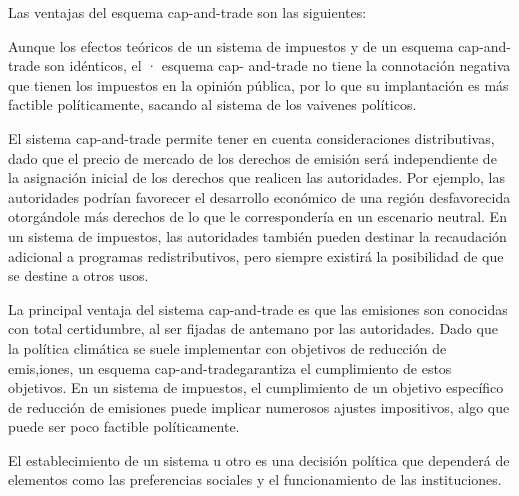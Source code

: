 \documentclass[10pt,a4paper]{article}
\begin{document}
Las ventajas del esquema cap-and-trade son las siguientes: 

Aunque los efectos teóricos de un sistema de impuestos y de un esquema cap-and-trade son idénticos, el · esquema cap- and-trade no tiene la connotación negativa que tienen los impuestos en la opinión pública, por lo que su implantación es más factible políticamente, sacando al sistema de los vaivenes políticos. 

El sistema cap-and-trade permite tener en cuenta consideraciones distributivas, dado que el precio de mercado de los derechos de emisión será independiente de la asignación inicial de los derechos que realicen las autoridades. Por ejemplo, las autoridades podrían favorecer el desarrollo económico de una región desfavorecida otorgándole más derechos de lo que le correspondería en un escenario neutral. En un sistema de impuestos, las autoridades también pueden destinar la recaudación adicional a programas redistributivos, pero siempre existirá la posibilidad de que se destine a otros usos. 

La principal ventaja del sistema cap-and-trade es que las emisiones son conocidas con total certidumbre, al ser fijadas de antemano por las autoridades. Dado que la política climática se suele implementar con objetivos de reducción de emis,iones, un esquema cap-and-tradegarantiza el cumplimiento de estos objetivos. En un sistema de impuestos, el cumplimiento de un objetivo específico de reducción de emisiones puede implicar numerosos ajustes impositivos, algo que puede ser poco factible políticamente. 

El establecimiento de un sistema u otro es una decisión política que dependerá de elementos como las preferencias sociales y el funcionamiento de las instituciones.
\end{document}
